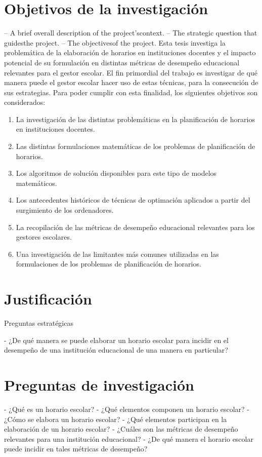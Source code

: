 \documentclass[draft,12pt,headsepline,footsepline,paper=letter]{scrreprt}
\begin{document}
\section{Objetivos de la investigación}
– A brief overall description of the project’scontext.
– The strategic question that guidesthe project.
– The objectivesof the project.
Esta tesis investiga la problemática de la elaboración de horarios en instituciones docentes y el impacto potencial de su formulación en distintas métricas de desempeño educacional relevantes para el gestor escolar. 
El fin primordial del trabajo es investigar de qué manera puede el gestor escolar hacer uso de estas técnicas, para la consecución de sus estrategias.
Para poder cumplir con esta finalidad, los siguientes objetivos son considerados:
\begin{enumerate}[1]
\item La investigación de las distintas problemáticas en la planificación de horarios en instituciones docentes.
\item Las distintas formulaciones matemáticas de los problemas de planificación de horarios.
\item Los algoritmos de solución disponibles para este tipo de modelos matemáticos.
\item Los antecedentes históricos de técnicas de optimación aplicados a partir del surgimiento de los ordenadores.
\item La recopilación de las métricas de desempeño educacional relevantes para los gestores escolares.
\item Una investigación de las limitantes más comunes utilizadas en las formulaciones de los problemas de planificación de horarios.
\end{enumerate}
\section{Justificación}

Preguntas estratégicas

- ¿De qué manera se puede elaborar un horario escolar para incidir en el desempeño de una institución educacional de una manera en particular?

\section{Preguntas de investigación}

- ¿Qué es un horario escolar?
- ¿Qué elementos componen un horario escolar?
- ¿Cómo se elabora un horario escolar? 
- ¿Qué elementos participan en la elaboración de un horario escolar?
- ¿Cuáles son las métricas de desempeño relevantes para una institución educacional?
- ¿De qué manera el horario escolar puede incidir en tales métricas de desempeño?
\end{document}
